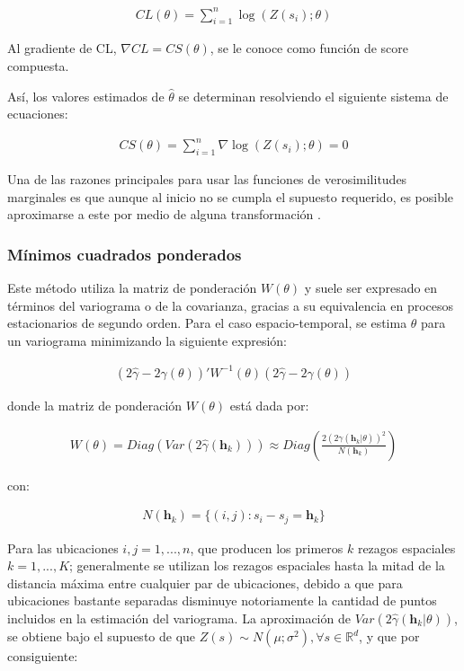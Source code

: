 \documentclass[
]{book}
\begin{document}
\begin{align}
   CL(\theta)=\sum_{i=1}^{n} \log(Z(s_i);\theta)  
\end{align}

Al gradiente de CL, \(\nabla CL=CS(\theta)\), se le conoce como función de score compuesta.

Así, los valores estimados de \(\hat{\theta}\) se determinan resolviendo el siguiente sistema de ecuaciones:

\begin{align}
   CS(\theta)=\sum_{i=1}^{n} \nabla\log(Z(s_i);\theta)=0  
\end{align}

Una de las razones principales para usar las funciones de verosimilitudes marginales es que aunque al inicio no se cumpla el supuesto requerido, es posible aproximarse a este por medio de alguna transformación \citep{marta}.

\hypertarget{muxednimos-cuadrados-ponderados}{%
\subsubsection*{Mínimos cuadrados ponderados}\label{muxednimos-cuadrados-ponderados}}

Este método utiliza la matriz de ponderación \(W(\theta)\) y suele ser expresado en términos del variograma o de la covarianza, gracias a su equivalencia en procesos estacionarios de segundo orden. Para el caso espacio-temporal, se estima \(\theta\) para un variograma minimizando la siguiente expresión:

\begin{align}
  (2\hat{\gamma}-2\gamma(\theta))'W^{-1}(\theta)(2\hat{\gamma}-2\gamma(\theta))  
\end{align}

donde la matriz de ponderación \(W(\theta)\) está dada por:

\begin{align}
  W(\theta)=Diag(Var(2\hat{\gamma}(\textbf{h}_k)))\approx Diag\left(\frac{2(2\gamma(\textbf{h}_k|\theta))^2}{N(\textbf{h}_k)}\right)  
\end{align}

con:

\begin{align}
  N(\textbf{h}_k)=\{(i,j):s_i-s_j=\textbf{h}_k\}  
\end{align}

Para las ubicaciones \(i,j=1,...,n\), que producen los primeros \(k\) rezagos espaciales \(k=1,...,K\); generalmente se utilizan los rezagos espaciales hasta la mitad de la distancia máxima entre cualquier par de ubicaciones, debido a que para ubicaciones bastante separadas disminuye notoriamente la cantidad de puntos incluidos en la estimación del variograma. La aproximación de \(Var(2\hat{\gamma}(\textbf{h}_k|\theta))\), se obtiene bajo el supuesto de que \(Z(s)\sim N(\mu;\sigma^2), \forall s\in \mathbb{R}^d\), y que por consiguiente:
\end{document}
